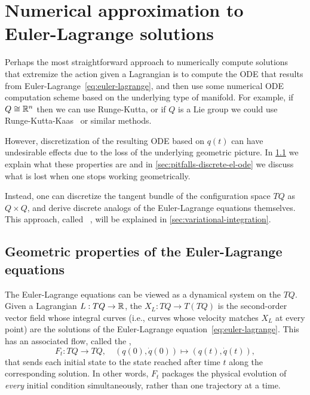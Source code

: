 \chapter[Numerical approximation to Euler-Lagrange solutions]{Numerical approximation to\protect\\ Euler-Lagrange solutions}\label{sec:euler-lagrange-solutions}

Perhaps the most straightforward approach to numerically compute solutions that extremize the action given a Lagrangian is to compute the ODE that results from Euler-Lagrange~\eqref{eq:euler-lagrange}, and then use some numerical ODE computation scheme based on the underlying type of manifold. For example, if $Q \cong {\mathbb{R}}^n$ then we can use Runge-Kutta, or if $Q$ is a Lie group we could use Runge-Kutta-Kaas~\cite{munthe-kaasRungeKuttaMethodsLie1998} or similar methods.

However, discretization of the resulting ODE based on $q(t)$ can have undesirable effects due to the loss of the underlying geometric picture. In \cref{sec:geometric-properties-el} we explain what these properties are and in \cref{sec:pitfalls-discrete-el-ode} we discuss what is lost when one stops working geometrically.

Instead, one can discretize the tangent bundle of the configuration space $TQ$ as $Q \times Q$, and derive discrete analogs of the Euler-Lagrange equations themselves. This approach, called ~\cite[\S1.3]{marsdenDiscreteMechanicsVariational2001}, will be explained in \cref{sec:variational-integration}.

\section{Geometric properties of the Euler-Lagrange equations}\label{sec:geometric-properties-el}

The Euler-Lagrange equations can be viewed as a dynamical system on the  $TQ$. Given a Lagrangian $L: TQ \to {\mathbb{R}}$, the  $X_L: TQ \to T(TQ)$ is the second-order vector field whose integral curves (i.e., curves whose velocity matches $X_L$ at every point) are the solutions of the Euler-Lagrange equation~\eqref{eq:euler-lagrange}. This has an associated flow, called the ,
\[ F_t : TQ \to TQ, \quad (q(0), \dot{q}(0)) \mapsto (q(t), \dot{q}(t)), \]
that sends each initial state to the state reached after time $t$ along the corresponding solution. In other words, $F_t$ packages the physical evolution of \emph{every} initial condition simultaneously, rather than one trajectory at a time.

